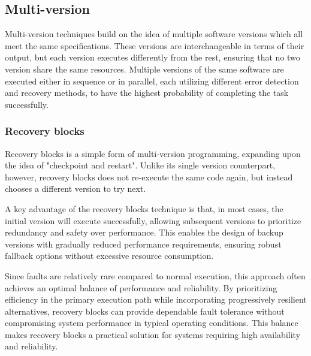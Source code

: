 \subsection{Multi-version} \label{multi}

Multi-version techniques build on the idea of multiple software versions which all meet the same specifications. These versions are interchangeable in terms of their output, but each version executes differently from the rest, ensuring that no two version share the same resources.
Multiple versions of the same software are executed either in sequence or in parallel, each utilizing different error detection and recovery methods, to have the highest probability of completing the task successfully.

\subsubsection{Recovery blocks}

Recovery blocks is a simple form of multi-version programming, expanding upon the idea of "checkpoint and restart". Unlike its single version counterpart, however, recovery blocks does not re-execute the same code again, but instead chooses a different version to try next.

A key advantage of the recovery blocks technique is that, in most cases, the initial version will execute successfully, allowing subsequent versions to prioritize redundancy and safety over performance. This enables the design of backup versions with gradually reduced performance requirements, ensuring robust fallback options without excessive resource consumption.



Since faults are relatively rare compared to normal execution, this approach often achieves an optimal balance of performance and reliability. By prioritizing efficiency in the primary execution path while incorporating progressively resilient alternatives, recovery blocks can provide dependable fault tolerance without compromising system performance in typical operating conditions. This balance makes recovery blocks a practical solution for systems requiring high availability and reliability.

